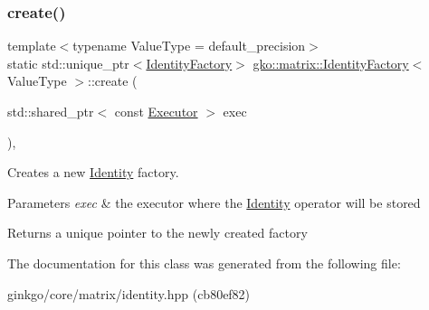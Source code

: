 \subsubsection{\texorpdfstring{create()}{create()}}
{\footnotesize\ttfamily template$<$typename Value\+Type  = default\+\_\+precision$>$ \\
static std\+::unique\+\_\+ptr$<$\hyperlink{classgko_1_1matrix_1_1IdentityFactory}{Identity\+Factory}$>$ \hyperlink{classgko_1_1matrix_1_1IdentityFactory}{gko\+::matrix\+::\+Identity\+Factory}$<$ Value\+Type $>$\+::create (\begin{DoxyParamCaption}\item[{std\+::shared\+\_\+ptr$<$ const \hyperlink{classgko_1_1Executor}{Executor} $>$}]{exec }\end{DoxyParamCaption})\hspace{0.3cm}{\ttfamily [inline]}, {\ttfamily [static]}}



Creates a new \hyperlink{classgko_1_1matrix_1_1Identity}{Identity} factory. 


\begin{DoxyParams}{Parameters}
{\em exec} & the executor where the \hyperlink{classgko_1_1matrix_1_1Identity}{Identity} operator will be stored\\
\hline
\end{DoxyParams}
\begin{DoxyReturn}{Returns}
a unique pointer to the newly created factory 
\end{DoxyReturn}


The documentation for this class was generated from the following file\+:\begin{DoxyCompactItemize}
\item 
ginkgo/core/matrix/identity.\+hpp (cb80ef82)\end{DoxyCompactItemize}
